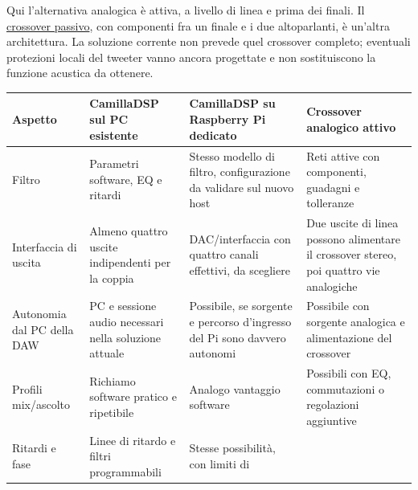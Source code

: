 \documentclass[
  italian,
  11pt,
  a4paper,
]{article}
\newcounter{none} %
\begin{document}
Qui l'alternativa analogica è attiva, a livello di linea e prima dei finali. Il
\href{../../docs/52-crossover-passivo-o-attivo.md}{crossover passivo}, con componenti fra un
finale e i due altoparlanti, è un'altra architettura. La soluzione corrente non prevede quel
crossover completo; eventuali protezioni locali del tweeter vanno ancora progettate e non
sostituiscono la funzione acustica da ottenere.

{\def\LTcaptype{none} %
\begin{longtable}[]{@{}
  >{\raggedright\arraybackslash}p{}
  >{\raggedright\arraybackslash}p{}
  >{\raggedright\arraybackslash}p{}
  >{\raggedright\arraybackslash}p{}@{}}
\toprule\noalign{}
\begin{minipage}[b]{\linewidth}\raggedright
Aspetto
\end{minipage} & \begin{minipage}[b]{\linewidth}\raggedright
CamillaDSP sul PC esistente
\end{minipage} & \begin{minipage}[b]{\linewidth}\raggedright
CamillaDSP su Raspberry Pi dedicato
\end{minipage} & \begin{minipage}[b]{\linewidth}\raggedright
Crossover analogico attivo
\end{minipage} \\
\midrule\noalign{}
\endhead
\bottomrule\noalign{}
\endlastfoot
Filtro & Parametri software, EQ e ritardi & Stesso modello di filtro, configurazione da
validare sul nuovo host & Reti attive con componenti, guadagni e tolleranze \\
Interfaccia di uscita & Almeno quattro uscite indipendenti per la coppia & DAC/interfaccia
con quattro canali effettivi, da scegliere & Due uscite di linea possono alimentare il
crossover stereo, poi quattro vie analogiche \\
Autonomia dal PC della DAW & PC e sessione audio necessari nella soluzione attuale &
Possibile, se sorgente e percorso d'ingresso del Pi sono davvero autonomi & Possibile con
sorgente analogica e alimentazione del crossover \\
Profili mix/ascolto & Richiamo software pratico e ripetibile & Analogo vantaggio software &
Possibili con EQ, commutazioni o regolazioni aggiuntive \\
Ritardi e fase & Linee di ritardo e filtri programmabili & Stesse possibilità, con limiti di

\end{longtable}}
\end{document}
